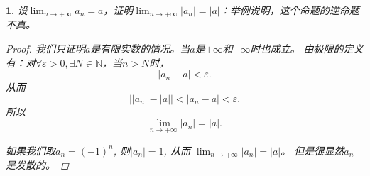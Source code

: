\documentclass[utf8]{book}
\newtheorem{example}{}[section]             %
\begin{document}
\begin{example}
设$\displaystyle \lim_{n\to +\infty}a_n = a$，证明$\displaystyle \lim_{n\to +\infty}\left |a_n\right | = \left |a\right |$：举例说明，这个命题的逆命题不真。
\begin{proof}
我们只证明$a$是有限实数的情况。当$a$是$+\infty$和$-\infty$时也成立。
由极限的定义有：对$\forall \varepsilon > 0, \exists N \in \mathbb{N}$，当$n > N$时，$$\left|a_n - a\right| < \varepsilon.$$
从而
$$\left| \left|a_n \right| - \left|a\right| \right | < \left|a_n - a\right| < \varepsilon.$$
所以 $$\lim_{n\to +\infty}\left |a_n\right | = \left |a\right |.$$

如果我们取$a_n = (-1)^n$, 则$\left | a_n\right | = 1$, 从而 $\displaystyle \lim_{n\to +\infty}\left |a_n\right | = \left |a\right |$。 但是很显然$a_n$是发散的。

\end{proof}

\end{example}
\end{document}
